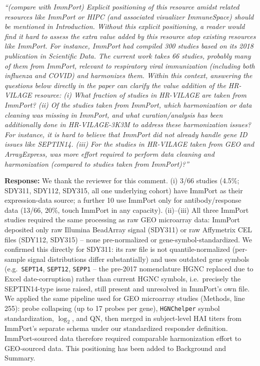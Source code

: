 \documentclass[11pt]{article}
\newcommand{\origcomment}[1]{\textit{``#1''}}
\newcommand{\filledresponse}[1]{%
  \par\medskip\noindent\textbf{Response:} #1\par
  \vspace{0.4cm}%
  \par\noindent\hrulefill\par\bigskip
}
\begin{document}
\begin{commentlist}

\item[R2-1.] \origcomment{(compare with ImmPort) Explicit positioning of this resource amidst
related resources like ImmPort or HIPC (and associated visualizer ImmuneSpace) should be
mentioned in Introduction. Without this explicit positioning, a reader would find it hard to
assess the extra value added by this resource atop existing resources like ImmPort. For instance,
ImmPort had compiled 300 studies based on its 2018 publication in Scientific Data. The current
work takes 66 studies, probably many of them from ImmPort, relevant to respiratory viral
immunization (including both influenza and COVID) and harmonizes them. Within this context,
answering the questions below directly in the paper can clarify the value addition of the
HR-VILAGE resource: (i) What fraction of studies in HR-VILAGE are taken from ImmPort? (ii) Of the
studies taken from ImmPort, which harmonization or data cleaning was missing in ImmPort, and what
curation/analysis has been additionally done in HR-VILAGE-3K3M to address these harmonization
issues? For instance, it is hard to believe that ImmPort did not already handle gene ID issues
like SEPTIN14. (iii) For the studies in HR-VILAGE taken from GEO and ArrayExpress, was more effort
required to perform data cleaning and harmonization (compared to studies taken from ImmPort)?}
\filledresponse{We thank the reviewer for this comment. (i) 3/66 studies (4.5\%; SDY311, SDY112,
SDY315, all one underlying cohort) have ImmPort as their expression-data source; a further 10 use
ImmPort only for antibody/response data (13/66, 20\%, touch ImmPort in any capacity). (ii)--(iii)
All three ImmPort studies required the same processing as raw GEO microarray data: ImmPort
deposited only raw Illumina BeadArray signal (SDY311) or raw Affymetrix CEL files (SDY112,
SDY315) -- none pre-normalized or gene-symbol-standardized. We confirmed this directly for SDY311:
its raw file is not quantile-normalized (per-sample signal distributions differ substantially) and
uses outdated gene symbols (e.g.\ \texttt{SEPT14}, \texttt{SEPT12}, \texttt{SEPP1} -- the pre-2017
nomenclature HGNC replaced due to Excel date-corruption) rather than current HGNC symbols, i.e.\
precisely the SEPTIN14-type issue raised, still present and unresolved in ImmPort's own file. We
applied the same pipeline used for GEO microarray studies (Methods, line 255): probe collapsing (up
to 17 probes per gene), \texttt{HGNChelper} symbol standardization, $\log_2$, and QN, then merged in
subject-level HAI titers from ImmPort's separate schema under our standardized responder
definition. ImmPort-sourced data therefore required comparable harmonization effort to GEO-sourced
data. This positioning has been added to Background and Summary.}


\end{commentlist}
\end{document}
